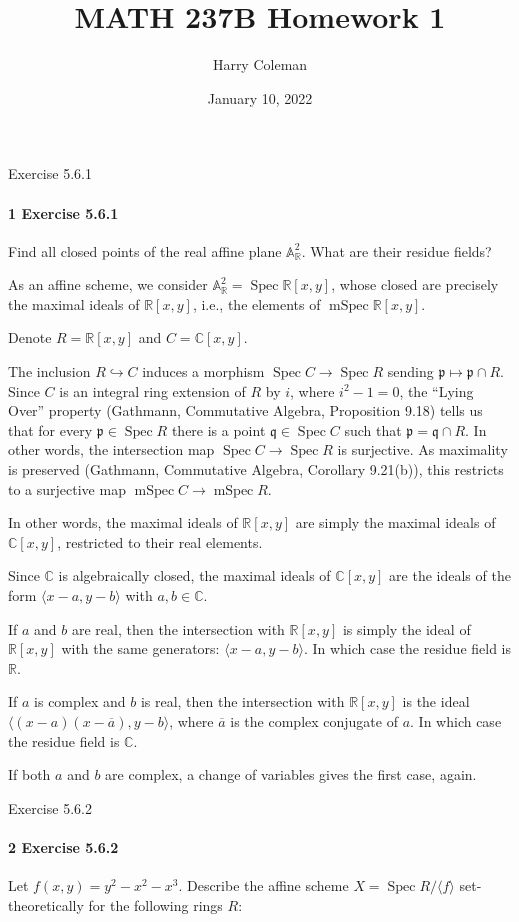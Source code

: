 \documentclass[12pt]{article}
\renewcommand{\maketitle}{\thispagestyle{title}}
\newlength{\myparskip}
\newenvironment{fullbox}{\begin{lrbox}{\savefullbox}\begin{minipage}{\dimexpr\textwidth-2\fboxsep\relax}\setlength{\parskip}{\myparskip}}{\end{minipage}\end{lrbox}\framebox[\textwidth]{\usebox{\savefullbox}}}
\newenvironment{pbox}[1][]{\begin{fullbox}\ifx#1\empty\else\paragraph{#1}\phantom{}\fi}{\end{fullbox}}
\theoremstyle{definition}
\newcommand{\R}{\mathbb{R}}
\newcommand{\C}{\mathbb{C}}
\newcommand{\A}{\mathbb{A}}
\newcommand{\<}{\langle}
\renewcommand{\>}{\rangle}
\DeclareMathOperator{\Spec}{Spec}
\DeclareMathOperator{\mSpec}{mSpec}
\newcommand{\pp}{\mathfrak{p}}
\newcommand{\qq}{\mathfrak{q}}
\newcommand{\inc}{\hookrightarrow}
\begin{document}
\title{MATH 237B Homework 1}
\author{Harry Coleman}
\date{January 10, 2022}
\maketitle

\begin{pbox}[1 Exercise 5.6.1]
    Find all closed points of the real affine plane $\A_\R^2$.
    What are their residue fields?
\end{pbox}

As an affine scheme, we consider $\A_\R^2 = \Spec\R[x, y]$, whose closed are precisely the maximal ideals of $\R[x, y]$, i.e., the elements of $\mSpec\R[x, y]$.

Denote $R = \R[x, y]$ and $C = \C[x, y]$.

The inclusion $R \inc C$ induces a morphism $\Spec C \to \Spec R$ sending $\pp \mapsto \pp \cap R$.
Since $C$ is an integral ring extension of $R$ by $i$, where $i^2 - 1 = 0$, the ``Lying Over'' property (Gathmann, Commutative Algebra, Proposition 9.18) tells us that for every $\pp \in \Spec R$ there is a point $\qq \in \Spec C$ such that $\pp = \qq \cap R$.
In other words, the intersection map $\Spec C \to \Spec R$ is surjective.
As maximality is preserved (Gathmann, Commutative Algebra, Corollary 9.21(b)), this restricts to a surjective map $\mSpec C \to \mSpec R$.

In other words, the maximal ideals of $\R[x, y]$ are simply the maximal ideals of $\C[x, y]$, restricted to their real elements.

Since $\C$ is algebraically closed, the maximal ideals of $\C[x, y]$ are the ideals of the form $\<x - a, y - b\>$ with $a, b \in \C$.

If $a$ and $b$ are real, then the intersection with $\R[x, y]$ is simply the ideal of $\R[x, y]$ with the same generators: $\<x - a, y - b\>$.
In which case the residue field is $\R$.

If $a$ is complex and $b$ is real, then the intersection with $\R[x, y]$ is the ideal $\<(x - a)(x - \overline{a}), y - b\>$, where $\overline{a}$ is the complex conjugate of $a$. In which case the residue field is $\C$.

If both $a$ and $b$ are complex, a change of variables gives the first case, again.





\newpage
\begin{pbox}[2 Exercise 5.6.2]
    Let $f(x, y) = y^2 - x^2 - x^3$.
    Describe the affine scheme $X = \Spec R/\<f\>$ set-theoretically for the following rings $R$:
\end{pbox}
\end{document}
